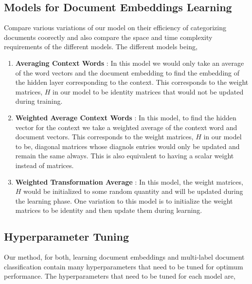 \documentclass{article}
\begin{document}
\subsection{Models for Document Embeddings Learning}
Compare various variations of our model on their efficiency of categorizing documents coorectly and also compare the space and time complexity requirements of the different models. The different models being, 
\begin{enumerate}
\item \textbf{Averaging Context Words} : In this model we would only take an average of the word vectors and the document embedding to find the embedding of the hidden layer corresponding to the context. This corresponds to the weight matrices, $H$ in our model to be identity matrices that would not be updated during training.

\item \textbf{Weighted Average Context Words} : In this model, to find the hidden vector for the context we take a weighted average of the context word and document vectors. This corresponds to the weight matrices, $H$ in our model to be, diagonal matrices whose diagnols entries would only be updated and remain the same always. This is also equivalent to having a scalar weight instead of matrices.

\item \textbf{Weighted Transformation Average} : In this model, the weight matrices, $H$ would be initialized to some random quantity and will be updated during the learning phase. One variation to this model is to initialize the weight matrices to be identity and then update them during learning.

\end{enumerate}

\subsection{Hyperparameter Tuning}
Our method, for both, learning document embeddings and multi-label document classification contain many hyperparameters that need to be tuned for optimum performance. The hyperparameters that need to be tuned for each model are,
\end{document}
